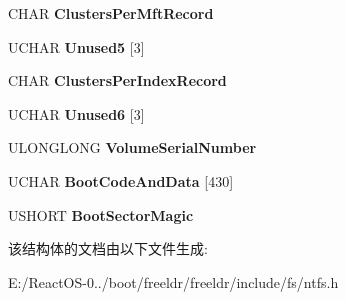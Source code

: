 \begin{DoxyCompactItemize}
C\+H\+AR {\bfseries Clusters\+Per\+Mft\+Record}
\item 
\mbox{\label{struct_n_t_f_s___b_o_o_t_s_e_c_t_o_r_a16d23ee25dd2500147583b2d768ca538}} 
U\+C\+H\+AR {\bfseries Unused5} \mbox{[}3\mbox{]}
\item 
\mbox{\label{struct_n_t_f_s___b_o_o_t_s_e_c_t_o_r_a7f34af636c89655e5b551e6e46943f29}} 
C\+H\+AR {\bfseries Clusters\+Per\+Index\+Record}
\item 
\mbox{\label{struct_n_t_f_s___b_o_o_t_s_e_c_t_o_r_a0ae9c09a9064b0cbd7bac3809b8358d4}} 
U\+C\+H\+AR {\bfseries Unused6} \mbox{[}3\mbox{]}
\item 
\mbox{\label{struct_n_t_f_s___b_o_o_t_s_e_c_t_o_r_a405e285789e991e140bc2d8b894eeb1f}} 
U\+L\+O\+N\+G\+L\+O\+NG {\bfseries Volume\+Serial\+Number}
\item 
\mbox{\label{struct_n_t_f_s___b_o_o_t_s_e_c_t_o_r_a089303c9ad3a7a2b88e0d7ed4379857d}} 
U\+C\+H\+AR {\bfseries Boot\+Code\+And\+Data} \mbox{[}430\mbox{]}
\item 
\mbox{\label{struct_n_t_f_s___b_o_o_t_s_e_c_t_o_r_aa96487f3569ff538079e9491e02b530c}} 
U\+S\+H\+O\+RT {\bfseries Boot\+Sector\+Magic}
\end{DoxyCompactItemize}


该结构体的文档由以下文件生成\+:\begin{DoxyCompactItemize}
\item 
E\+:/\+React\+O\+S-\/0../boot/freeldr/freeldr/include/fs/ntfs.\+h\end{DoxyCompactItemize}
